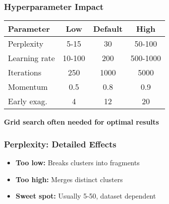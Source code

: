 \documentclass[aspectratio=169]{beamer}
\begin{document}
\begin{frame}
\frametitle{Hyperparameter Impact}

\begin{center}
\small
\begin{tabular}{l|c|c|c}
\textbf{Parameter} & \textbf{Low} & \textbf{Default} & \textbf{High}\\
\hline
Perplexity & 5-15 & 30 & 50-100\\
Learning rate & 10-100 & 200 & 500-1000\\
Iterations & 250 & 1000 & 5000\\
Momentum & 0.5 & 0.8 & 0.9\\
Early exag. & 4 & 12 & 20\\
\end{tabular}
\end{center}

\vspace{0.3cm}
\textbf{Grid search often needed for optimal results}

\end{frame}

\begin{frame}
\frametitle{Perplexity: Detailed Effects}

\begin{center}
\end{center}

\begin{itemize}
\item \textbf{Too low:} Breaks clusters into fragments
\item \textbf{Too high:} Merges distinct clusters
\item \textbf{Sweet spot:} Usually 5-50, dataset dependent
\end{itemize}

\end{frame}
\end{document}
